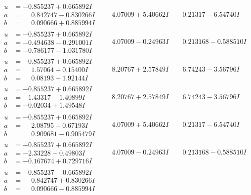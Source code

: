 \documentclass[1p]{elsarticle_modified}
\theoremstyle{definition}
\begin{document}
$$\begin{array}{c|c|c}
\begin{aligned}
u &= -0.855237 + 0.665892 I \\
a &= \phantom{-}0.842747 - 0.830266 I \\
b &= \phantom{-}0.090666 + 0.885994 I\end{aligned}
 & \phantom{-}4.07009 + 5.40662 I & \phantom{-}0.21317 - 6.54740 I \\ \hline\begin{aligned}
u &= -0.855237 + 0.665892 I \\
a &= -0.494638 - 0.291001 I \\
b &= -0.786177 - 1.031780 I\end{aligned}
 & \phantom{-}4.07009 - 0.24963 I & \phantom{-}0.213168 - 0.588510 I \\ \hline\begin{aligned}
u &= -0.855237 + 0.665892 I \\
a &= \phantom{-}1.57064 + 0.15400 I \\
b &= \phantom{-}0.08193 - 1.92144 I\end{aligned}
 & \phantom{-}8.20767 + 2.57849 I & \phantom{-}6.74243 - 3.56796 I \\ \hline\begin{aligned}
u &= -0.855237 + 0.665892 I \\
a &= -1.43317 - 1.40899 I \\
b &= -0.02034 + 1.49548 I\end{aligned}
 & \phantom{-}8.20767 + 2.57849 I & \phantom{-}6.74243 - 3.56796 I \\ \hline\begin{aligned}
u &= -0.855237 + 0.665892 I \\
a &= \phantom{-}2.08795 + 0.67193 I \\
b &= \phantom{-}0.909681 - 0.905479 I\end{aligned}
 & \phantom{-}4.07009 + 5.40662 I & \phantom{-}0.21317 - 6.54740 I \\ \hline\begin{aligned}
u &= -0.855237 + 0.665892 I \\
a &= -2.33228 - 0.49803 I \\
b &= -0.167674 + 0.729716 I\end{aligned}
 & \phantom{-}4.07009 - 0.24963 I & \phantom{-}0.213168 - 0.588510 I \\ \hline\begin{aligned}
u &= -0.855237 - 0.665892 I \\
a &= \phantom{-}0.842747 + 0.830266 I \\
b &= \phantom{-}0.090666 - 0.885994 I\end{aligned}

\end{array}$$
\end{document}
